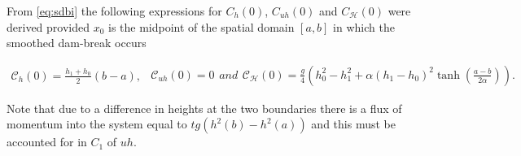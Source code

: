 \documentclass[SingleSpace,12pt,Journal]{Serre_ASCE}
\begin{document}
From \eqref{eq:sdbi} the following expressions for $C_{h}(0)$, $C_{uh}(0)$ and $C_{\mathcal{H}}(0)$ were derived provided $x_0$ is the midpoint of the spatial domain $\left[a,b \right]$ in which the smoothed dam-break occurs
\begin{linenomath*}
	\begin{subequations}
	\begin{gather*}
	\mathcal{C}_{h}(0) = \frac{h_1 + h_0}{2}\left(b- a\right),
	\label{eq:Chdef}
	\end{gather*}
	\begin{gather*}
	\mathcal{C}_{uh}(0) = 0
	\label{eq:Cuhdef}
	\end{gather*}
		and
	\begin{gather*}
	\mathcal{C}_{\mathcal{H}}(0) = \frac{g}{4} \left(h_0^2 - h_1^2 + \alpha\left(h_1 - h_0\right)^2\tanh\left(\frac{a - b}{2 \alpha}\right)\right).
	\label{eq:CHdef}
	\end{gather*}
		\label{eq:Canalyticvalues}	
	\end{subequations}
\end{linenomath*}
Note that due to a difference in heights at the two boundaries there is a flux of momentum into the system equal to $tg\left(h^2(b) - h^2(a)\right)$ and this must be accounted for in $C_1$ of $uh$.
\end{document}
